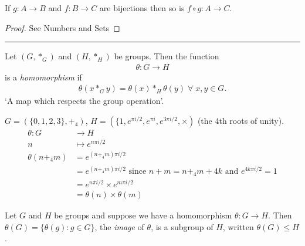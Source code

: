 \begin{lemma}
\protect\hypertarget{lem:two}{}\label{lem:two}If \(g: A \to B\) and \(f: B \to C\) are bijections then so is \(f \circ g: A \to C\).
\end{lemma}

\begin{proof}
See Numbers and Sets
\end{proof}

\begin{center}\rule{\linewidth}{0.5pt}\end{center}

\begin{definition}
\protect\hypertarget{def:homomorphism}{}\label{def:homomorphism}
Let \((G, *_G)\) and \((H, *_H)\) be groups. Then the function
\begin{align*}
    \theta : G \to H
\end{align*} is a \emph{homomorphism} if
\begin{align*}
    \theta(x *_G y) = \theta(x) *_H \theta(y) \; \forall \; x, y \in G.
\end{align*}
`A map which respects the group operation'.
\end{definition}

\begin{example}
\protect\hypertarget{exm:isomorphism}{}\label{exm:isomorphism}
\(G = (\{ 0, 1, 2, 3 \}, +_4)\), \(H = (\{1, e^{\pi i/2}, e^{\pi i}, e^{3\pi i/2}, \times)\) (the 4th roots of unity).
\begin{align*}
    \theta: G &\to H \\
    n &\mapsto e^{n \pi i /2} \\
    \theta(n +_4 m) &= e^{(n +_4 m) \pi i /2} \\
    &= e^{(n +_4 m) \pi i /2} \text{ since $n + m = n +_4 m + 4k$ and $e^{4k \pi i /2} = 1$} \\
    &= e^{n \pi i /2} \times e^{m \pi i /2} \\
    &= \theta(n) \times \theta(m)
\end{align*}
\end{example}

\begin{lemma} \label{lem:three}
Let \(G\) and \(H\) be groups and suppose we have a homomorphism \(\theta : G \to H\).
Then \(\theta(G) = \{ \theta(g) : g \in G\}\), the \emph{image} of \(\theta\), is a subgroup of \(H\), written \(\theta(G) \leq H\).
\end{lemma}

